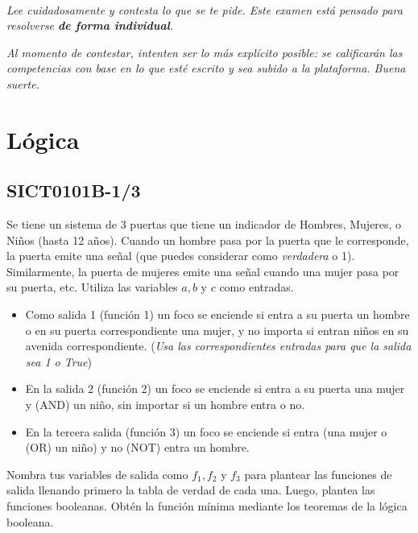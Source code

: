 \documentclass{article}
\title{
    \myclass \\
    \textbf{\mytitle} \\
    \date{}
}
\begin{document}
\maketitle

\vspace{-1.5cm}

{%
\footnotesize
\textit{Lee cuidadosamente y contesta lo que se te pide.
Este examen está pensado para resolverse \textbf{de forma individual}.}

\textit{Al momento de contestar, intenten ser lo más explícito posible: se calificarán las competencias con base en lo que esté escrito y sea subido a la plataforma.
Buena suerte.}
}

\section{Lógica}

\subsection{SICT0101B-1/3}

Se tiene un sistema de 3 puertas que tiene un indicador de Hombres, Mujeres, o Niños (hasta 12 años).
Cuando un hombre pasa por la puerta que le corresponde, la puerta emite una señal (que puedes considerar como \textit{verdadera} o 1).
Similarmente, la puerta de mujeres emite una señal cuando una mujer pasa por su puerta, etc.
Utiliza las variables $a, b$ y $c$ como entradas.

\begin{itemize}
    \item Como salida 1 (función 1) un foco se enciende si entra a su puerta un hombre o en su puerta correspondiente una mujer, y no importa si entran niños en su avenida correspondiente.
    (\textit{\footnotesize Usa las correspondientes entradas para que la salida sea 1 o True})
    \item En la salida 2 (función 2) un foco se enciende si entra a su puerta una mujer y (AND) un niño, sin importar si un hombre entra o no.
    \item En la tercera salida (función 3) un foco se enciende si entra (una mujer o (OR) un niño) y no (NOT)  entra un hombre.
\end{itemize}

Nombra tus variables de salida como $f_1, f_2$ y $f_3$ para plantear las funciones de salida llenando primero la tabla de verdad de cada una. Luego, plantea las funciones booleanas.
Obtén la función mínima mediante los teoremas de la lógica booleana.
\end{document}
